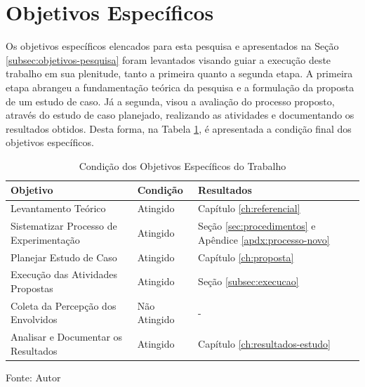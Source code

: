 \section{Objetivos Específicos}

Os objetivos específicos elencados para esta pesquisa e apresentados na Seção \ref{subsec:objetivos-pesquisa} foram levantados visando guiar a execução deste trabalho em sua plenitude, tanto a primeira quanto a segunda etapa. A primeira etapa abrangeu a fundamentação teórica da pesquisa e a formulação da proposta de um estudo de caso. Já a segunda, visou a avaliação do processo proposto, através do estudo de caso planejado, realizando as atividades e documentando os resultados obtidos. Desta forma, na Tabela \ref{tab:objetivos-especificos}, é apresentada a condição final dos objetivos específicos.


\begin{table}[ht]
\centering
    \caption{Condição dos Objetivos Específicos do Trabalho}
    \begin{tabular}{|p{7.5cm}|p{2.5cm}|p{4.5cm}|}
        \hline
        \textbf{Objetivo} & \textbf{Condição} & \textbf{Resultados} \\ \hline
        Levantamento Teórico & Atingido & Capítulo \ref{ch:referencial} \\ \hline
        Sistematizar Processo de Experimentação & Atingido & Seção \ref{sec:procedimentos} e Apêndice \ref{apdx:processo-novo} \\ \hline
        Planejar Estudo de Caso & Atingido & Capítulo \ref{ch:proposta} \\ \hline
        Execução das Atividades Propostas & Atingido & Seção \ref{subsec:execucao} \\ \hline
        Coleta da Percepção dos Envolvidos & Não Atingido & - \\ \hline
        Analisar e Documentar os Resultados & Atingido & Capítulo \ref{ch:resultados-estudo} \\ \hline
    \end{tabular}

    \label{tab:objetivos-especificos}
    
    \begin{center}
        \text Fonte: Autor
    \end{center}
\end{table}
